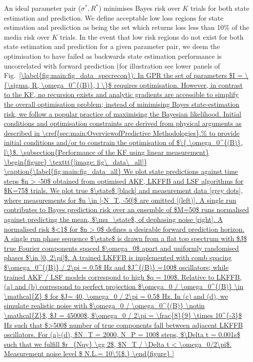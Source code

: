 An ideal parameter pair ($\sigma^*, R^*$) minimises Bayes risk over $K$ trials for both state estimation and prediction.  We define acceptable low loss regions for state estimation and prediction as being the set which returns loss less than 10\% of the media risk over $K$ trials.  In the event that low risk regions do not exist for both state estimation and prediction for a given parameter pair, we deem the optimisation to have failed as backwards state estimation performance is uncorrelated with forward prediction (for illustration see lower panels of Fig.~\ref{\label{fig:main:fig_data_specrecon}).

In GPR the set of parameters $I = \{\sigma, R, \omega_0^{(B)}, l \}$ requires optimisation.  However, in contrast to the KF, no recursion exists and analytic gradients are accessible to simplify the overall optimisation problem; instead of minimising Bayes state-estimation risk, we follow a popular practice of maximising the Bayesian likelihood. Initial conditions and optimisation constraints are derived from physical arguments as described in \cref{sec:main:OverviewofPredictive Methodologies}.%





\subsection{Performance of the KF using linear measurement}
\begin{figure}
    \texttt{[image: fig\_data\_all]}
    \caption{\label{fig:main:fig_data_all} We plot state predictions against time steps $n > -50$ obtained from optimised AKF, LKFFB and LSF algorithms for $K=75$ trials. We plot true $\state$ [black] and measurement data [grey dots], where measurements for $n \in [-N_T, -50]$ are omitted [(left)]. A single run contributes to Bayes prediction risk over an ensemble of $M=50$ runs normalised against predicting the mean, $\mu_\state$, of dephasing noise [right]. A normalised risk $<1$ for $n > 0$ defines a desirable forward prediction horizon. A single run phase sequence $\state$ is drawn from a flat top spectrum with $J$ true Fourier components spaced $\omega_0$ apart and uniformly randomised phases $\in [0, 2\pi]$. A trained LKFFB is implemented with comb spacing $\omega_0^{(B)} / 2\pi = 0.5$ Hz and $J^{(B)} =100$ oscillators; while trained AKF / LSF models correspond to high $q = 100$. Relative to LKFFB,  (a) and (b) correspond to perfect projection $\omega_0 / \omega_0^{(B)}  \in \mathcal{Z} $ for $J= 40, \omega_0 / 2\pi = 0.5$ Hz. In (c) and (d), we simulate realistic noise with $\omega_0 / \omega_0^{(B)}  \notin \mathcal{Z}$, $J = 45000$, $\omega_0 / 2\pi = \frac{8}{9} \times 10^{-3}$ Hz such that $>500$ number of true components fall between adjacent LKFFB oscillators. For (a)-(d), $N_T = 2000, N_P = 100$ steps, $\Delta t = 0.001s$ such that we fulfill $r_{Nqy} \gg 2$, $N_T / \Delta t < \omega_0/2\pi$. Measurement noise level $ N.L.= 10\%$.}
\end{figure}  

}
